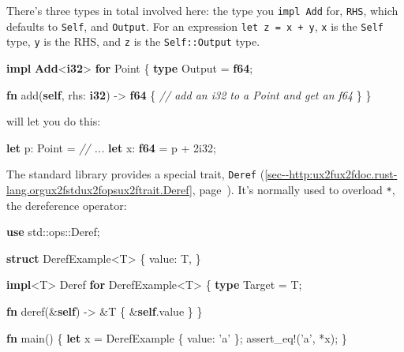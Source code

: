 \documentclass[a4paper,]{book}
\renewcommand*{\hyperref}[2][\ar]{%
  \def\ar{#2}%
  #2 (\autoref{#1}, page~\pageref{#1})}
\newenvironment{Shaded}{\begin{snugshade}}{\end{snugshade}}
\newcommand{\KeywordTok}[1]{\textcolor[rgb]{0.13,0.29,0.53}{\textbf{{#1}}}}
\newcommand{\DecValTok}[1]{\textcolor[rgb]{0.00,0.00,0.81}{{#1}}}
\newcommand{\CharTok}[1]{\textcolor[rgb]{0.31,0.60,0.02}{{#1}}}
\newcommand{\CommentTok}[1]{\textcolor[rgb]{0.56,0.35,0.01}{\textit{{#1}}}}
\newcommand{\OtherTok}[1]{\textcolor[rgb]{0.56,0.35,0.01}{{#1}}}
\newcommand{\NormalTok}[1]{{#1}}
\begin{document}
There's three types in total involved here: the type you
\texttt{impl\ Add} for, \texttt{RHS}, which defaults to \texttt{Self},
and \texttt{Output}. For an expression \texttt{let\ z\ =\ x\ +\ y},
\texttt{x} is the \texttt{Self} type, \texttt{y} is the RHS, and
\texttt{z} is the \texttt{Self::Output} type.

\begin{Shaded}
\begin{Highlighting}[]
\KeywordTok{impl} \KeywordTok{Add}\NormalTok{<}\KeywordTok{i32}\NormalTok{> }\KeywordTok{for} \NormalTok{Point \{}
    \KeywordTok{type} \NormalTok{Output = }\KeywordTok{f64}\NormalTok{;}

    \KeywordTok{fn} \NormalTok{add(}\KeywordTok{self}\NormalTok{, rhs: }\KeywordTok{i32}\NormalTok{) -> }\KeywordTok{f64} \NormalTok{\{}
        \CommentTok{// add an i32 to a Point and get an f64}
    \NormalTok{\}}
\NormalTok{\}}
\end{Highlighting}
\end{Shaded}

will let you do this:

\begin{Shaded}
\begin{Highlighting}[]
\KeywordTok{let} \NormalTok{p: Point = }\CommentTok{// ...}
\KeywordTok{let} \NormalTok{x: }\KeywordTok{f64} \NormalTok{= p + }\DecValTok{2i32}\NormalTok{;}
\end{Highlighting}
\end{Shaded}


The standard library provides a special trait,
\hyperref[sec--http:ux2fux2fdoc.rust-lang.orgux2fstdux2fopsux2ftrait.Deref]{\texttt{Deref}}.
It's normally used to overload \texttt{*}, the dereference operator:

\begin{Shaded}
\begin{Highlighting}[]
\KeywordTok{use} \NormalTok{std::ops::Deref;}

\KeywordTok{struct} \NormalTok{DerefExample<T> \{}
    \NormalTok{value: T,}
\NormalTok{\}}

\KeywordTok{impl}\NormalTok{<T> Deref }\KeywordTok{for} \NormalTok{DerefExample<T> \{}
    \KeywordTok{type} \NormalTok{Target = T;}

    \KeywordTok{fn} \NormalTok{deref(&}\KeywordTok{self}\NormalTok{) -> &T \{}
        \NormalTok{&}\KeywordTok{self}\NormalTok{.value}
    \NormalTok{\}}
\NormalTok{\}}

\KeywordTok{fn} \NormalTok{main() \{}
    \KeywordTok{let} \NormalTok{x = DerefExample \{ value: }\CharTok{'a'} \NormalTok{\};}
    \OtherTok{assert_eq!}\NormalTok{(}\CharTok{'a'}\NormalTok{, *x);}
\NormalTok{\}}
\end{Highlighting}
\end{Shaded}
\end{document}
